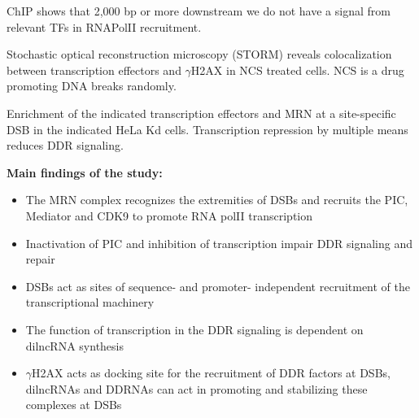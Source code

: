 ChIP shows that 2,000 bp or more downstream we do not have a signal from relevant TFs in RNAPolII recruitment.

Stochastic optical reconstruction microscopy (STORM) reveals colocalization between transcription effectors and \(\gamma\)H2AX in NCS treated cells. NCS is a drug promoting DNA breaks randomly.

Enrichment of the indicated transcription effectors and MRN at a site-specific DSB in the indicated HeLa Kd cells. Transcription repression by multiple means reduces DDR signaling.

\textbf{Main findings of the study:}

\begin{itemize}
\tightlist
\item
  The MRN complex recognizes the extremities of DSBs and recruits the PIC, Mediator and CDK9 to promote RNA polII transcription
\item
  Inactivation of PIC and inhibition of transcription impair DDR signaling and repair
\item
  DSBs act as sites of sequence- and promoter- independent recruitment of the transcriptional machinery
\item
  The function of transcription in the DDR signaling is dependent on dilncRNA synthesis
\item
  \(\gamma\)H2AX acts as docking site for the recruitment of DDR factors at DSBs, dilncRNAs and DDRNAs can act in promoting and stabilizing these complexes at DSBs
\end{itemize}
